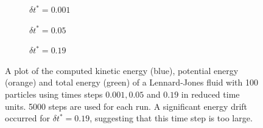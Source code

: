 \documentclass{article}
\theoremstyle{plain}\theoremheaderfont{\normalfont\itshape}\theorembodyfont{\rmfamily}\theoremseparator{.}\newtheorem*{rem}{Remark}\newtheorem*{ex}{Example}\newtheorem*{proof}{Proof}\newtheorem*{altp}{Alternative proof}
\theoremstyle{plain}\theoremheaderfont{\normalfont\bfseries}\theorembodyfont{\rmfamily}\theoremseparator{.}\newtheorem{thm}{Theorem}[section]\newtheorem{lem}[thm]{Lemma}\newtheorem{prop}[thm]{Proposition}\newtheorem*{cor}{Corollary}\newtheorem{defn}[thm]{Definition}\newtheorem{clm}[thm]{Claim}\newtheorem{clminproof}{Claim}\newtheorem{alg}[thm]{Algorithm}\newtheorem{hyp}[thm]{Hypothesis}\newtheorem{law}[thm]{Law}
\theoremstyle{break}\theoremheaderfont{\normalfont\itshape}\theorembodyfont{\rmfamily}\theoremseparator{.\medskip}\newtheorem*{proofskip}{Proof}\newtheorem*{exs}{Examples}\newtheorem*{rems}{Remarks}
\theoremstyle{break}\theoremheaderfont{\normalfont\bfseries}\theorembodyfont{\rmfamily}\theoremseparator{.\medskip}\newtheorem{lemskip}[thm]{Lemma}\newtheorem{defnskip}[thm]{Definition}\newtheorem{propskip}[thm]{Proposition}\newtheorem{thmskip}[thm]{Theorem}
\numberwithin{equation}{section}
\begin{document}
    \begin{figure}
        \begin{subfigure}[h]{0.32\linewidth}
            \begin{adjustbox}{width=\linewidth}
            
            \end{adjustbox}
            \caption{\(\delta t^*=0.001\)}
        \end{subfigure}
        \hfill
        \begin{subfigure}[h]{0.32\linewidth}
            \begin{adjustbox}{width=\linewidth}
            
            \end{adjustbox}
            \caption{\(\delta t^*=0.05\)}
        \end{subfigure}
        \hfill
        \begin{subfigure}[h]{0.32\linewidth}
            \begin{adjustbox}{width=\linewidth}
            
            \end{adjustbox}
            \caption{\(\delta t^*=0.19\)}
        \end{subfigure}%
        \caption{A plot of the computed kinetic energy (blue), potential energy (orange) and total energy (green) of a Lennard-Jones fluid with 100 particles using times steps \(0.001,0.05\) and \(0.19\) in reduced time units. 5000 steps are used for each run. A significant energy drift occurred for \(\delta t^*=0.19\), suggesting that this time step is too large.}
    \end{figure}
\end{document}
